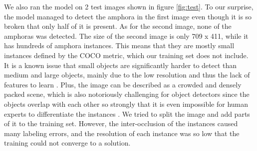 \documentclass[a4paper, 11pt, oneside]{article}
\begin{document}
We also ran the model on 2 test images shown in figure \ref{fig:test}. To our surprise, the model managed to detect
the amphora in the first image even though it is so broken that only half of it is present. As for the second image,
none of the amphoras was detected. The size of the second image is only 709 x 411, while it has hundreds of
amphora instances. This means that they are mostly small instances defined by the COCO metric, which our training set
does not include. It is a known issue that small objects are significantly harder to detect than medium and
large objects, mainly due to the low resolution and thus the lack of features to learn
\cite{kisantal2019augmentation, li2017perceptual, eggert2017closer}.
Plus, the image can be described as a crowded and densely packed scene, which is also notoriously challenging for object
detectors since the objects overlap with each other so strongly that it is even impossible for human experts to
differentiate the instances \cite{pasquet2017amphora, goldman2019precise, leibe2005pedestrian, arteta2013learning}.
We tried to split the image and add parts of it to the training set. However, the inter-occlusion of the
instances caused many labeling errors, and the resolution of each instance was so low that the training could not
converge to a solution.
\end{document}
